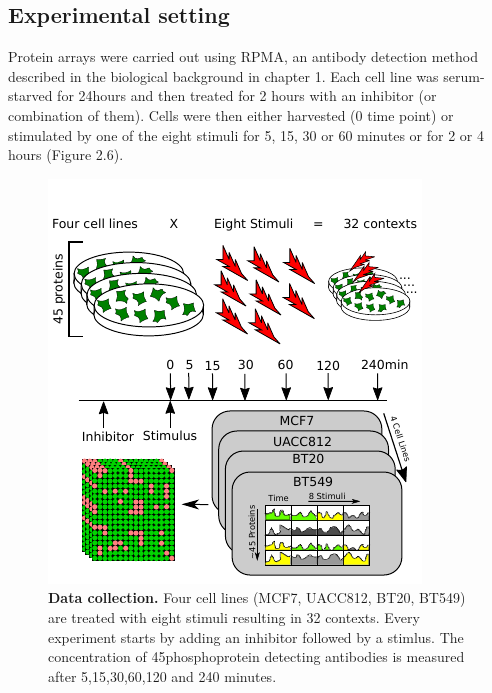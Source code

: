 \subsection*{Experimental setting}
Protein arrays were carried out using RPMA, an antibody detection method described in the biological background in chapter 1. Each cell line was serum-starved for 24hours and then treated for 2 hours with an inhibitor (or combination of them). Cells were then either harvested (0 time point) or stimulated by one of the eight stimuli for 5, 15, 30 or 60 minutes or for 2 or 4 hours (Figure 2.6).
\begin{figure}
\begin{minipage}{0.5\linewidth}
\includegraphics{./Bilder/datacollectiondream8.pdf}
\end{minipage}
\caption[Data Collection of the Dream8 Challenge data set]{\textbf{Data collection.} Four cell lines (MCF7, UACC812, BT20, BT549) are treated with eight stimuli resulting in 32 contexts. Every experiment starts by adding an inhibitor followed by a stimlus. The concentration of 45phosphoprotein detecting antibodies is measured after 5,15,30,60,120 and 240 minutes. }
\label{fig:7}
\end{figure}




